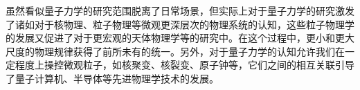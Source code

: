 虽然看似量子力学的研究范围脱离了日常场景，但实际上对于量子力学的研究激发了诸如对于核物理、粒子物理等微观更深层次的物理系统的认知，这些粒子物理学的发展又促进了对于更宏观的天体物理学等的研究中。在这个过程中，更小和更大尺度的物理规律获得了前所未有的统一。另外，对于量子力学的认知允许我们在一定程度上操控微观粒子，如核聚变、核裂变、原子钟等，它们之间的相互关联引导了量子计算机、半导体等先进物理学技术的发展。
% 
% 
